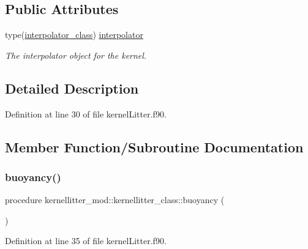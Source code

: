 \subsection*{Public Attributes}
\begin{DoxyCompactItemize}
\item 
type(\mbox{\hyperlink{structinterpolator__mod_1_1interpolator__class}{interpolator\+\_\+class}}) \mbox{\hyperlink{structkernellitter__mod_1_1kernellitter__class_a76f96b14a094f09db8cb72d56fea7ecf}{interpolator}}
\begin{DoxyCompactList}\small\item\em The interpolator object for the kernel. \end{DoxyCompactList}\end{DoxyCompactItemize}


\subsection{Detailed Description}


Definition at line 30 of file kernel\+Litter.\+f90.



\subsection{Member Function/\+Subroutine Documentation}
\mbox{\label{structkernellitter__mod_1_1kernellitter__class_ae273210976c4a16ec9e76dff0a1ef034}} 
\subsubsection{\texorpdfstring{buoyancy()}{buoyancy()}}
{\footnotesize\ttfamily procedure kernellitter\+\_\+mod\+::kernellitter\+\_\+class\+::buoyancy (\begin{DoxyParamCaption}{ }\end{DoxyParamCaption})}



Definition at line 35 of file kernel\+Litter.\+f90.

\mbox{\label{structkernellitter__mod_1_1kernellitter__class_ac0baa73b7ea63898095e6345271bccc4}} 
